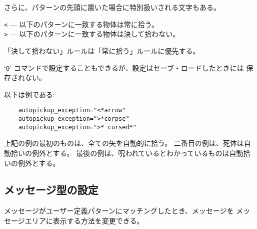 さらに、パターンの先頭に置いた場合に特別扱いされる文字もある。

{\tt <} --- 以下のパターンに一致する物体は常に拾う。\\
{\tt >} --- 以下のパターンに一致する物体は決して拾わない。

「決して拾わない」ルールは「常に拾う」ルールに優先する。

`{\tt O}' コマンドで設定することもできるが、設定はセーブ・ロードしたときには
保存されない。
\elist

以下は例である:
\begin{verbatim}
    autopickup_exception="<*arrow"
    autopickup_exception=">*corpse"
    autopickup_exception=">* cursed*"
\end{verbatim}

上記の例の最初のものは、全ての矢を自動的に拾う。
二番目の例は、死体は自動拾いの例外とする。
最後の例は、呪われているとわかっているものは自動拾いの例外とする。

\subsection*{メッセージ型の設定}

メッセージがユーザー定義パターンにマッチングしたとき、メッセージを
メッセージエリアに表示する方法を変更できる。

